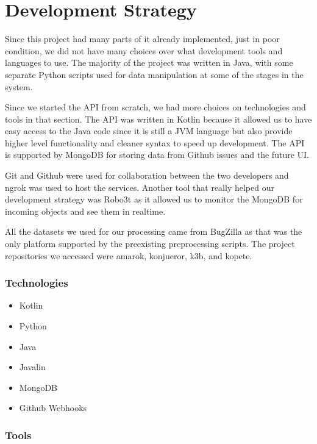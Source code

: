 \documentclass[12pt]{article}
\providecommand{\tightlist}{%
  \setlength{\itemsep}{0pt}\setlength{\parskip}{0pt}}
\begin{document}
\hypertarget{development-strategy}{%
\section{Development Strategy}\label{development-strategy}}

Since this project had many parts of it already implemented, just in
poor condition, we did not have many choices over what development tools
and languages to use. The majority of the project was written in Java,
with some separate Python scripts used for data manipulation at some of
the stages in the system.

Since we started the API from scratch, we had more choices on
technologies and tools in that section. The API was written in Kotlin
because it allowed us to have easy access to the Java code since it is
still a JVM language but also provide higher level functionality and
cleaner syntax to speed up development. The API is supported by MongoDB
for storing data from Github issues and the future UI.

Git and Github were used for collaboration between the two developers
and ngrok was used to host the services. Another tool that really helped
our development strategy was Robo3t as it allowed us to monitor the
MongoDB for incoming objects and see them in realtime.

All the datasets we used for our processing came from BugZilla as that
was the only platform supported by the preexisting preprocessing
scripts. The project repositories we accessed were amarok, konjueror,
k3b, and kopete.

\hypertarget{technologies}{%
\subsubsection{Technologies}\label{technologies}}

\begin{itemize}
\tightlist
\item
  Kotlin
\item
  Python
\item
  Java
\item
  Javalin
\item
  MongoDB
\item
  Github Webhooks
\end{itemize}

\hypertarget{tools}{%
\subsubsection{Tools}\label{tools}}
\end{document}
